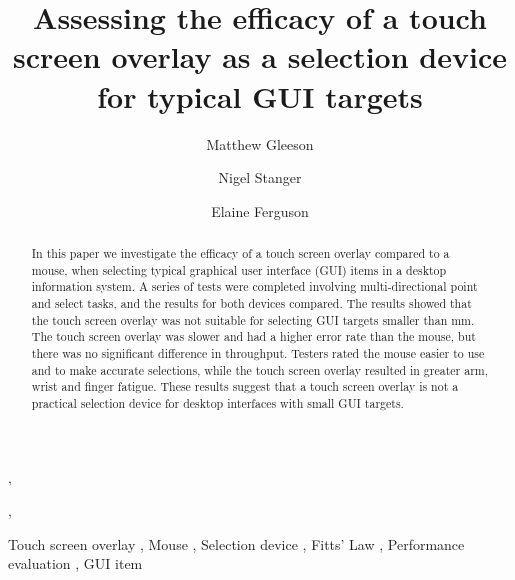 \documentclass[reviewcopy]{elsart}
\begin{document}
\begin{frontmatter}



\title{Assessing the efficacy of a touch screen overlay as a selection
device for typical GUI targets}


\author[info]{Matthew Gleeson},
\author[info]{Nigel Stanger},
\author[hunt]{Elaine Ferguson}

\address[info]{Department of Information Science,}
\address[hunt]{Department of Human Nutrition, \\ University of Otago, PO Box 56, Dunedin, New Zealand}


\begin{abstract}

In this paper we investigate the efficacy of a touch screen overlay
compared to a mouse, when selecting typical graphical user interface
(GUI) items in a desktop information system. A series of tests were
completed involving multi-directional point and select tasks, and the
results for both devices compared. The results showed that the touch
screen overlay was not suitable for selecting GUI targets smaller than
\unit[4]{mm}. The touch screen overlay was slower and had a higher error
rate than the mouse, but there was no significant difference in
throughput. Testers rated the mouse easier to use and to make accurate
selections, while the touch screen overlay resulted in greater arm,
wrist and finger fatigue. These results suggest that a touch screen
overlay is not a practical selection device for desktop interfaces with
small GUI targets.

\end{abstract}

\begin{keyword}
Touch screen overlay \sep
Mouse \sep
Selection device \sep
Fitts' Law \sep
Performance evaluation \sep
GUI item
\end{keyword}

\end{frontmatter}
\end{document}
